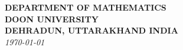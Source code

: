 \begin{titlepage}
\begin{center}
  \vfill

  {\bf\large DEPARTMENT OF MATHEMATICS} \\%
  {\bf\large DOON UNIVERSITY}\\%
  {\bf\large DEHRADUN, UTTARAKHAND INDIA}\\[1em]
  {\it\large \today }

\end{center}
\end{titlepage}

\clearpage


